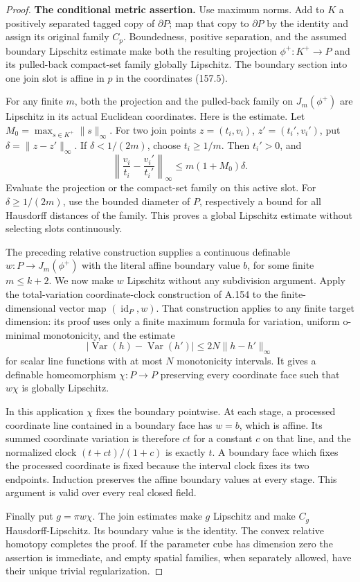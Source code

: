 \begin{proof}
\textbf{The conditional metric assertion.}
Use maximum norms. Add to \(K\) a positively separated tagged copy of \(\partial P\); map that copy to \(\partial P\) by the identity and assign its original family \(C_p\). Boundedness, positive separation, and the assumed boundary Lipschitz estimate make both the resulting projection \(\phi^+:K^+\to P\) and its pulled-back compact-set family globally Lipschitz. The boundary section into one join slot is affine in \(p\) in the coordinates (157.5).

For any finite \(m\), both the projection and the pulled-back family on \(J_m(\phi^+)\) are Lipschitz in its actual Euclidean coordinates. Here is the estimate. Let \(M_0=\max_{s\in K^+}\|s\|_\infty\). For two join points \(z=(t_i,v_i)\), \(z'=(t_i',v_i')\), put \(\delta=\|z-z'\|_\infty\). If \(\delta<1/(2m)\), choose \(t_i\ge1/m\). Then \(t_i'>0\), and
\[
 \left\|\frac{v_i}{t_i}-\frac{v_i'}{t_i'}\right\|_\infty
 \le m(1+M_0)\delta.
 \tag{157.10}
\]
Evaluate the projection or the compact-set family on this active slot. For \(\delta\ge1/(2m)\), use the bounded diameter of \(P\), respectively a bound for all Hausdorff distances of the family. This proves a global Lipschitz estimate without selecting slots continuously.

The preceding relative construction supplies a continuous definable \(w:P\to J_m(\phi^+)\) with the literal affine boundary value \(b\), for some finite \(m\le k+2\). We now make \(w\) Lipschitz without any subdivision argument. Apply the total-variation coordinate-clock construction of A.154 to the finite-dimensional vector map \((\operatorname{id}_P,w)\). That construction applies to any finite target dimension: its proof uses only a finite maximum formula for variation, uniform o-minimal monotonicity, and the estimate
\[
 |\operatorname{Var}(h)-\operatorname{Var}(h')|
       \le 2N\|h-h'\|_\infty
\]
for scalar line functions with at most \(N\) monotonicity intervals. It gives a definable homeomorphism \(\chi:P\to P\) preserving every coordinate face such that \(w\chi\) is globally Lipschitz.

In this application \(\chi\) fixes the boundary pointwise. At each stage, a processed coordinate line contained in a boundary face has \(w=b\), which is affine. Its summed coordinate variation is therefore \(ct\) for a constant \(c\) on that line, and the normalized clock \((t+ct)/(1+c)\) is exactly \(t\). A boundary face which fixes the processed coordinate is fixed because the interval clock fixes its two endpoints. Induction preserves the affine boundary values at every stage. This argument is valid over every real closed field.

Finally put \(g=\pi w\chi\). The join estimates make \(g\) Lipschitz and make \(C_g\) Hausdorff-Lipschitz. Its boundary value is the identity. The convex relative homotopy completes the proof. If the parameter cube has dimension zero the assertion is immediate, and empty spatial families, when separately allowed, have their unique trivial regularization.
\end{proof}

